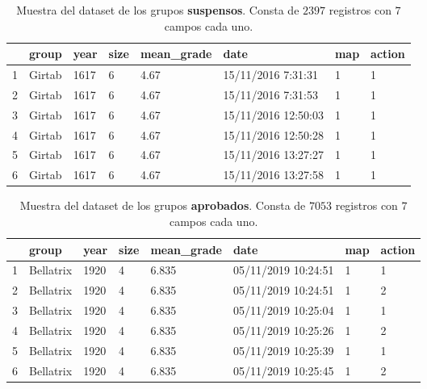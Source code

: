 \documentclass[10pt,a4paper]{article}
\begin{document}
\begin{table}[ht]
\centering
\begin{tabular}{rlllllll}
  \hline
 & group & year & size & mean\_grade & date & map & action \\ 
  \hline
1 & Girtab & 1617 & 6 & 4.67 & 15/11/2016 7:31:31  & 1 & 1 \\ 
  2 & Girtab & 1617 & 6 & 4.67 & 15/11/2016 7:31:53  & 1 & 1 \\ 
  3 & Girtab & 1617 & 6 & 4.67 & 15/11/2016 12:50:03 & 1 & 1 \\ 
  4 & Girtab & 1617 & 6 & 4.67 & 15/11/2016 12:50:28 & 1 & 1 \\ 
  5 & Girtab & 1617 & 6 & 4.67 & 15/11/2016 13:27:27 & 1 & 1 \\ 
  6 & Girtab & 1617 & 6 & 4.67 & 15/11/2016 13:27:58 & 1 & 1 \\ 
   \hline
\end{tabular}
\caption{Muestra del dataset de los grupos \textbf{suspensos}. Consta de $2397$ registros con $7$ campos cada uno.}
\label{table:11}
\end{table}

\begin{table}[ht]
\centering
\begin{tabular}{rlllllll}
  \hline
 & group & year & size & mean\_grade & date & map & action \\ 
  \hline
1 & Bellatrix & 1920 & 4 & 6.835 & 05/11/2019 10:24:51 & 1 & 1 \\ 
  2 & Bellatrix & 1920 & 4 & 6.835 & 05/11/2019 10:24:51 & 1 & 2 \\ 
  3 & Bellatrix & 1920 & 4 & 6.835 & 05/11/2019 10:25:04 & 1 & 1 \\ 
  4 & Bellatrix & 1920 & 4 & 6.835 & 05/11/2019 10:25:26 & 1 & 2 \\ 
  5 & Bellatrix & 1920 & 4 & 6.835 & 05/11/2019 10:25:39 & 1 & 1 \\ 
  6 & Bellatrix & 1920 & 4 & 6.835 & 05/11/2019 10:25:45 & 1 & 2 \\ 
   \hline
\end{tabular}
\caption{Muestra del dataset de los grupos \textbf{aprobados}. Consta de $7053$ registros con $7$ campos cada uno.}
\label{table:12}
\end{table}
\end{document}
